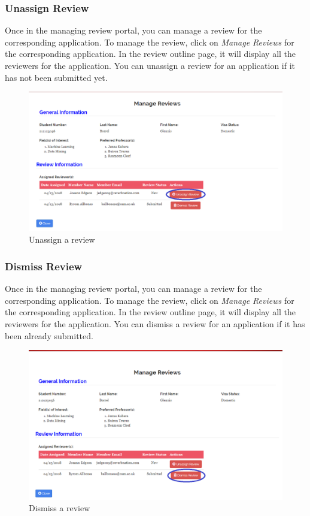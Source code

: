 \documentclass[fontsize=12pt,paper=letter,twoside]{scrartcl}
\begin{document}
\subsubsection{Unassign Review}
Once in the managing review portal, you can manage a review for the corresponding application. To manage the review, click on \emph{Manage Reviews} for the corresponding application. In the review outline page, it will display all the reviewers for the application. You can unassign a review for an application if it has not been submitted yet.

\begin{figure}[!htb]
\begin{center}
\includegraphics[width=.99\textwidth]{images/adm/mr/unassign_review.png}
\end{center}
\caption{Unassign a review}
\label{fig:adm/unassign_review}
\end{figure}

\clearpage
\subsubsection{Dismiss Review}
Once in the managing review portal, you can manage a review for the corresponding application. To manage the review, click on \emph{Manage Reviews} for the corresponding application. In the review outline page, it will display all the reviewers for the application. You can dismiss a review for an application if it has been already submitted.

\begin{figure}[!htb]
\begin{center}
\includegraphics[width=.99\textwidth]{images/adm/mr/dismiss_review.png}
\end{center}
\caption{Dismiss a review}
\label{fig:adm/dismiss_review}
\end{figure}
\end{document}

